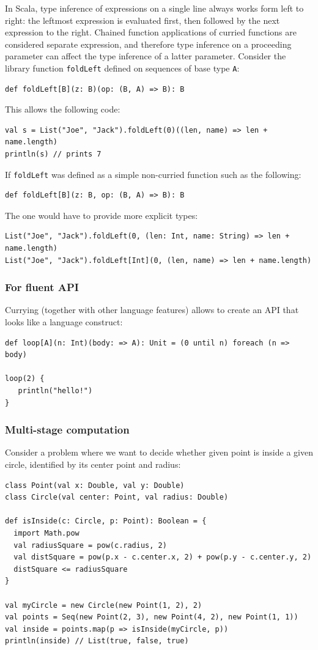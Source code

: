 In Scala, type inference of expressions on a single line always works form left to right: the leftmost expression is evaluated first, then followed by the next expression to the right. Chained function applications of curried functions are considered separate expression, and therefore type inference on a proceeding parameter can affect the type inference of a latter parameter. Consider the library function \texttt{foldLeft} defined on sequences of base type \texttt{A}:
\begin{lstlisting}
def foldLeft[B](z: B)(op: (B, A) => B): B
\end{lstlisting}
This allows the following code:
\begin{lstlisting}
val s = List("Joe", "Jack").foldLeft(0)((len, name) => len + name.length)
println(s) // prints 7
\end{lstlisting}
If \texttt{foldLeft} was defined as a simple non-curried function such as the following:
\begin{lstlisting}
def foldLeft[B](z: B, op: (B, A) => B): B
\end{lstlisting}
The one would have to provide more explicit types:
\begin{lstlisting}
List("Joe", "Jack").foldLeft(0, (len: Int, name: String) => len + name.length)
List("Joe", "Jack").foldLeft[Int](0, (len, name) => len + name.length)
\end{lstlisting}

\subsubsection{For fluent API}
Currying (together with other language features) allows to create an API that looks like a language construct:
\begin{lstlisting}
def loop[A](n: Int)(body: => A): Unit = (0 until n) foreach (n => body)

loop(2) {
   println("hello!")
}
\end{lstlisting}

\subsubsection{Multi-stage computation}

Consider a problem where we want to decide whether given point is inside a given circle, identified by its center point and radius:

\begin{lstlisting}
class Point(val x: Double, val y: Double)
class Circle(val center: Point, val radius: Double)

def isInside(c: Circle, p: Point): Boolean = {
  import Math.pow
  val radiusSquare = pow(c.radius, 2)
  val distSquare = pow(p.x - c.center.x, 2) + pow(p.y - c.center.y, 2)
  distSquare <= radiusSquare
}

val myCircle = new Circle(new Point(1, 2), 2)
val points = Seq(new Point(2, 3), new Point(4, 2), new Point(1, 1))
val inside = points.map(p => isInside(myCircle, p))
println(inside) // List(true, false, true)
\end{lstlisting}

